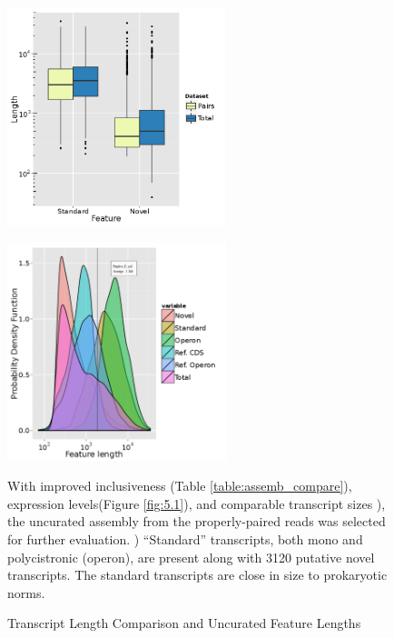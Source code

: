 \begin{figure}[t]
\small
\begin{center}
\begin{minipage}{.5\textwidth}
\begin{center}
{\includegraphics[width=\linewidth,height=2.5in]{images/Assembly/Comparison/TotvsPaired_length.png}
\label{fig:5.2a}}
\end{center}
\end{minipage}%
\begin{minipage}{.5\textwidth}
\begin{center}
{\includegraphics[width=\linewidth,height=2.5in]{images/Assembly/Summary/ffeature_length_1.png}
\label{fig:5.2b}}
\end{center}
\end{minipage}
\end{center}
\caption{Transcript Length Comparison and Uncurated Feature Lengths}
With improved inclusiveness (Table \ref{table:assemb_compare}), expression levels(Figure \ref{fig:5.1}), and comparable transcript sizes ), the uncurated assembly from the properly-paired reads was selected for further evaluation. ) ``Standard'' transcripts, both mono and polycistronic (operon), are present along with 3120 putative novel transcripts. The standard transcripts are close in size to prokaryotic norms\cite{86}.
\end{figure}


